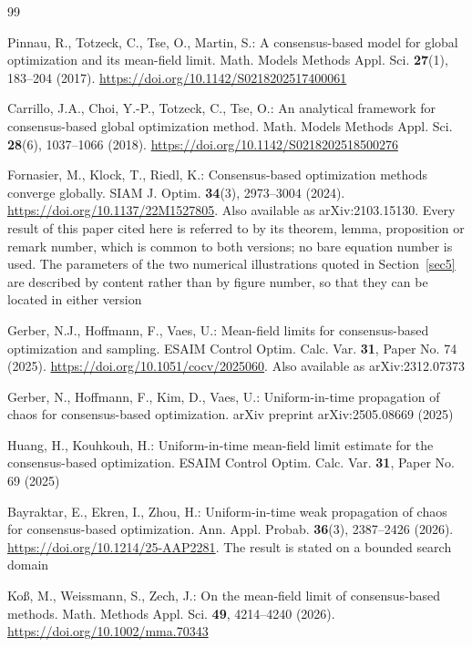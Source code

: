 \documentclass[pdflatex,sn-mathphys-num]{sn-jnl}
\theoremstyle{thmstyleone}
\theoremstyle{thmstyletwo}
\theoremstyle{thmstylethree}
\begin{document}
\begin{thebibliography}{99}

Pinnau, R., Totzeck, C., Tse, O., Martin, S.: A consensus-based model for global optimization and its mean-field limit. Math. Models Methods Appl. Sci. \textbf{27}(1), 183--204 (2017). \url{https://doi.org/10.1142/S0218202517400061}

Carrillo, J.A., Choi, Y.-P., Totzeck, C., Tse, O.: An analytical framework for consensus-based global optimization method. Math. Models Methods Appl. Sci. \textbf{28}(6), 1037--1066 (2018). \url{https://doi.org/10.1142/S0218202518500276}

Fornasier, M., Klock, T., Riedl, K.: Consensus-based optimization methods converge globally. SIAM J. Optim. \textbf{34}(3), 2973--3004 (2024). \url{https://doi.org/10.1137/22M1527805}. Also available as arXiv:2103.15130. Every result of this paper cited here is referred to by its theorem, lemma, proposition or remark number, which is common to both versions; no bare equation number is used. The parameters of the two numerical illustrations quoted in Section~\ref{sec5} are described by content rather than by figure number, so that they can be located in either version

Gerber, N.J., Hoffmann, F., Vaes, U.: Mean-field limits for consensus-based optimization and sampling. ESAIM Control Optim. Calc. Var. \textbf{31}, Paper No. 74 (2025). \url{https://doi.org/10.1051/cocv/2025060}. Also available as arXiv:2312.07373

Gerber, N., Hoffmann, F., Kim, D., Vaes, U.: Uniform-in-time propagation of chaos for consensus-based optimization. arXiv preprint arXiv:2505.08669 (2025)

Huang, H., Kouhkouh, H.: Uniform-in-time mean-field limit estimate for the consensus-based optimization. ESAIM Control Optim. Calc. Var. \textbf{31}, Paper No. 69 (2025)

Bayraktar, E., Ekren, I., Zhou, H.: Uniform-in-time weak propagation of chaos for consensus-based optimization. Ann. Appl. Probab. \textbf{36}(3), 2387--2426 (2026). \url{https://doi.org/10.1214/25-AAP2281}. The result is stated on a bounded search domain

Ko\ss{}, M., Weissmann, S., Zech, J.: On the mean-field limit of consensus-based methods. Math. Methods Appl. Sci. \textbf{49}, 4214--4240 (2026). \url{https://doi.org/10.1002/mma.70343}


\end{thebibliography}
\end{document}

